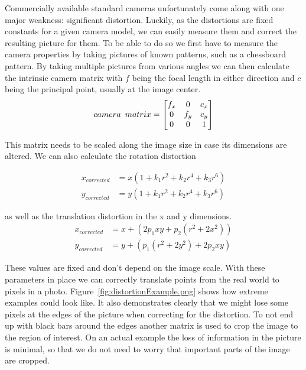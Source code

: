 Commercially available standard cameras unfortunately come along with one major weakness: significant distortion.
Luckily, as the distortions are fixed constants for a given camera model, we can easily measure them and correct the resulting picture for them.
To be able to do so we first have to measure the camera properties by taking pictures of known patterns, such as a chessboard pattern.
By taking multiple pictures from various angles we can then calculate the intrinsic camera matrix with $f$ being the focal length in either direction and $c$ being the principal point, usually at the image center.
\[
    camera \hspace{5px}matrix =
    \begin{bmatrix}
        f_{x} & 0 & c_{x} \\
        0 & f_{y} & c_{y} \\
        0 & 0 & 1
    \end{bmatrix}
\]

This matrix needs to be scaled along the image size in case its dimensions are altered.
We can also calculate the rotation distortion

\begin{align*}
    x_{corrected} &= x(1 + k_{1}r^{2} + k_{2}r^{4} + k_{3}r^{6}) \\
    y_{corrected} &= y(1 + k_{1}r^{2} + k_{2}r^{4} + k_{3}r^{6})
\end{align*}

as well as the translation distortion in the x and y dimensions.
\begin{align*}
    x_{corrected} &= x + (2p_{1}xy + p_{2}(r^{2} + 2x^{2})) \\
    y_{corrected} &= y + (p_{1} (r^{2} + 2y^{2}) + 2p_{2}xy)
\end{align*}

These values are fixed and don't depend on the image scale.
With these parameters in place we can correctly translate points from the real world to pixels in a photo.
Figure~\ref{fig:distortionExample.png} shows how extreme examples could look like.
It also demonstrates clearly that we might lose some pixels at the edges of the picture when correcting for the distortion.
To not end up with black bars around the edges another matrix is used to crop the image to the region of interest.
On an actual example the loss of information in the picture is minimal, so that we do not need to worry that important parts of the image are cropped.

